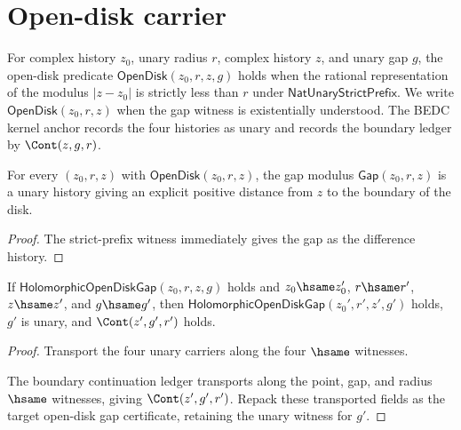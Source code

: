 \section{Open-disk carrier}

\begin{definition}
\label{def:open-disk}
For complex history \(z_0\), unary radius \(r\), complex history \(z\), and unary gap \(g\), the open-disk predicate \(\mathsf{OpenDisk}(z_0, r, z, g)\) holds when the rational representation of the modulus \(|z - z_0|\) is strictly less than \(r\) under \(\mathsf{NatUnaryStrictPrefix}\). We write \(\mathsf{OpenDisk}(z_0,r,z)\) when the gap witness is existentially understood. The BEDC kernel anchor records the four histories as unary and records the boundary ledger by \(\Cont(z,g,r)\).
\end{definition}

\begin{lemma}
\label{lem:open-disk-unary-witness}
For every $(z_0, r, z)$ with $\mathsf{OpenDisk}(z_0, r, z)$, the gap modulus $\mathsf{Gap}(z_0, r, z)$ is a unary history giving an explicit positive distance from $z$ to the boundary of the disk.
\end{lemma}
\begin{proof}
The strict-prefix witness immediately gives the gap as the difference history.
\end{proof}

\begin{lemma}
\label{lem:open-disk-gap-transport-certificate}
If $\mathsf{HolomorphicOpenDiskGap}(z_0,r,z,g)$ holds and
$z_0\hsame z_0'$, $r\hsame r'$, $z\hsame z'$, and $g\hsame g'$,
then $\mathsf{HolomorphicOpenDiskGap}(z_0',r',z',g')$ holds, $g'$ is
unary, and $\Cont(z',g',r')$ holds.
\end{lemma}
\begin{proof}
Transport the four unary carriers along the four $\hsame$ witnesses.

The boundary continuation ledger transports along the point, gap, and radius
$\hsame$ witnesses, giving $\Cont(z',g',r')$. Repack these transported fields
as the target open-disk gap certificate, retaining the unary witness for $g'$.
\end{proof}

